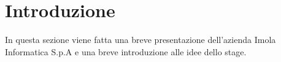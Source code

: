 
\chapter{Introduzione}\label{ch:introduzione}

In questa sezione viene fatta una breve presentazione dell'azienda Imola Informatica S.p.A e una breve introduzione alle idee dello stage.
%
%






